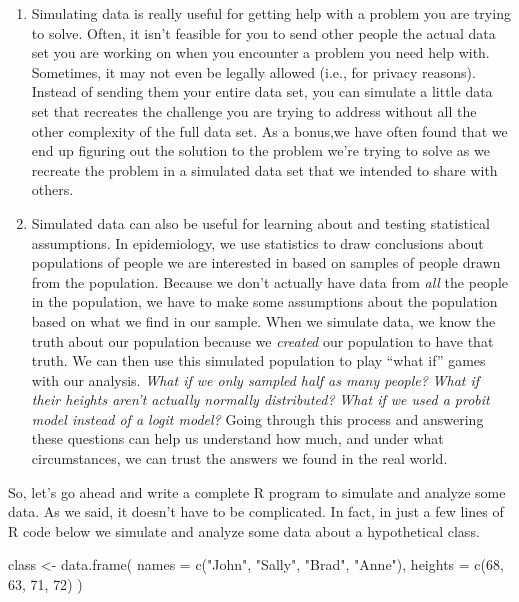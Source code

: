 \documentclass[
  letterpaper,
  DIV=11,
  numbers=noendperiod]{scrreprt}
\newenvironment{Shaded}{\begin{snugshade}}{\end{snugshade}}
\newcommand{\AttributeTok}[1]{\textcolor[rgb]{0.40,0.45,0.13}{#1}}
\newcommand{\DecValTok}[1]{\textcolor[rgb]{0.68,0.00,0.00}{#1}}
\newcommand{\FunctionTok}[1]{\textcolor[rgb]{0.28,0.35,0.67}{#1}}
\newcommand{\NormalTok}[1]{\textcolor[rgb]{0.00,0.23,0.31}{#1}}
\newcommand{\OtherTok}[1]{\textcolor[rgb]{0.00,0.23,0.31}{#1}}
\newcommand{\StringTok}[1]{\textcolor[rgb]{0.13,0.47,0.30}{#1}}
\begin{document}
\begin{enumerate}
\def\labelenumi{\arabic{enumi}.}
\item
  Simulating data is really useful for getting help with a problem you
  are trying to solve. Often, it isn't feasible for you to send other
  people the actual data set you are working on when you encounter a
  problem you need help with. Sometimes, it may not even be legally
  allowed (i.e., for privacy reasons). Instead of sending them your
  entire data set, you can simulate a little data set that recreates the
  challenge you are trying to address without all the other complexity
  of the full data set. As a bonus,we have often found that we end up
  figuring out the solution to the problem we're trying to solve as we
  recreate the problem in a simulated data set that we intended to share
  with others.
\item
  Simulated data can also be useful for learning about and testing
  statistical assumptions. In epidemiology, we use statistics to draw
  conclusions about populations of people we are interested in based on
  samples of people drawn from the population. Because we don't actually
  have data from \emph{all} the people in the population, we have to
  make some assumptions about the population based on what we find in
  our sample. When we simulate data, we know the truth about our
  population because we \emph{created} our population to have that
  truth. We can then use this simulated population to play ``what if''
  games with our analysis. \emph{What if we only sampled half as many
  people?} \emph{What if their heights aren't actually normally
  distributed?} \emph{What if we used a probit model instead of a logit
  model?} Going through this process and answering these questions can
  help us understand how much, and under what circumstances, we can
  trust the answers we found in the real world.
\end{enumerate}

So, let's go ahead and write a complete R program to simulate and
analyze some data. As we said, it doesn't have to be complicated. In
fact, in just a few lines of R code below we simulate and analyze some
data about a hypothetical class.

\begin{Shaded}
\begin{Highlighting}[]
\NormalTok{class }\OtherTok{\textless{}{-}} \FunctionTok{data.frame}\NormalTok{(}
  \AttributeTok{names   =} \FunctionTok{c}\NormalTok{(}\StringTok{"John"}\NormalTok{, }\StringTok{"Sally"}\NormalTok{, }\StringTok{"Brad"}\NormalTok{, }\StringTok{"Anne"}\NormalTok{),}
  \AttributeTok{heights =} \FunctionTok{c}\NormalTok{(}\DecValTok{68}\NormalTok{, }\DecValTok{63}\NormalTok{, }\DecValTok{71}\NormalTok{, }\DecValTok{72}\NormalTok{)}
\NormalTok{)}
\end{Highlighting}
\end{Shaded}
\end{document}
